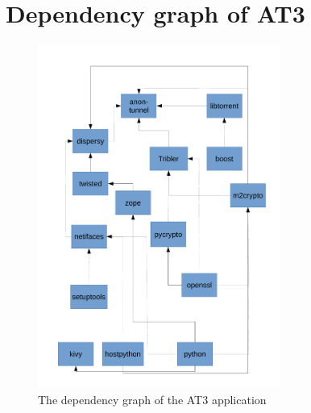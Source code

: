 \chapter{Dependency graph of AT3}
\label{chp:dependency-tree}

\begin{figure}[!h]
    \centering
    \includegraphics[width=0.71\textwidth]{appendices/dependency-tree.pdf}
    \caption{The dependency graph of the AT3 application}
\end{figure}